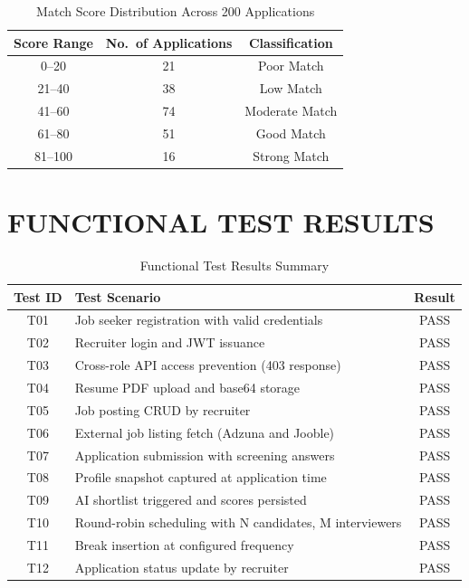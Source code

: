 \documentclass[12pt,a4paper]{report}
\begin{document}
\begin{table}[H]
    \centering
    \caption{Match Score Distribution Across 200 Applications}
    \label{tab:distrib}
    \begin{tabular}{|c|c|c|}
        \hline
        \textbf{Score Range} & \textbf{No.\ of Applications} & \textbf{Classification} \\
        \hline
        0--20   & 21  & Poor Match \\
        21--40  & 38  & Low Match \\
        41--60  & 74  & Moderate Match \\
        61--80  & 51  & Good Match \\
        81--100 & 16  & Strong Match \\
        \hline
    \end{tabular}
\end{table}

\section{FUNCTIONAL TEST RESULTS}

\begin{table}[H]
    \centering
    \caption{Functional Test Results Summary}
    \label{tab:testresults}
    \begin{tabular}{|c|l|c|}
        \hline
        \textbf{Test ID} & \textbf{Test Scenario} & \textbf{Result} \\
        \hline
        T01 & Job seeker registration with valid credentials & PASS \\
        T02 & Recruiter login and JWT issuance & PASS \\
        T03 & Cross-role API access prevention (403 response) & PASS \\
        T04 & Resume PDF upload and base64 storage & PASS \\
        T05 & Job posting CRUD by recruiter & PASS \\
        T06 & External job listing fetch (Adzuna and Jooble) & PASS \\
        T07 & Application submission with screening answers & PASS \\
        T08 & Profile snapshot captured at application time & PASS \\
        T09 & AI shortlist triggered and scores persisted & PASS \\
        T10 & Round-robin scheduling with N candidates, M interviewers & PASS \\
        T11 & Break insertion at configured frequency & PASS \\
        T12 & Application status update by recruiter & PASS \\
        \hline
    \end{tabular}
\end{table}
\end{document}
